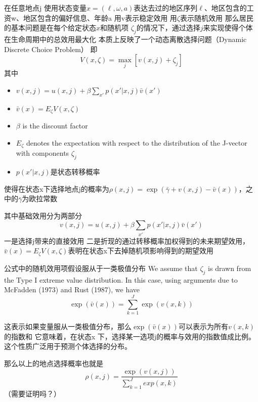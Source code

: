 \documentclass[10pt,a4paper]{article}
\begin{document}
在任意地点j
使用状态变量$x=(\ell,\omega,a)$表达去过的地区序列$\ell$、地区包含的工资w、地区包含的偏好信息、年龄a
用v表示稳定效用
用$\zeta$表示随机效用
那么居民的基本问题是在每个给定状态$x$和随机项 $\zeta_j$的情况下，通过选择$j$来实现使得个体在生命周期中的总效用最大化
本质上反映了一个动态离散选择问题（Dynamic Discrete Choice Problem）
即
\begin{equation}
V(x,\zeta)=\max\limits_{j}[v(x,j)+\zeta_{j}]
\end{equation}
其中
\begin{itemize}
\item $v(x, j) = u(x, j) + \beta \sum_{x'} p(x' | x, j) \bar{v}(x')$
\item $\bar{v}(x) = E_{\zeta} V(x, \zeta)$
\item $\beta$ is the discount factor
\item $E_{\zeta}$ denotes the expectation with respect to the distribution of the J-vector with components $\zeta_{j}$
\item $p(x'|x,j)$是状态转移概率
\end{itemize}

使得在状态x下选择地点j的概率为$\rho(x,j)=\exp(\bar \gamma+v(x,j)-\bar v(x))$，之中的$\bar \gamma$为欧拉常数

其中基础效用分为两部分
\begin{equation}
  v(x, j) = u(x, j) + \beta \sum_{x'} p(x' | x, j) \bar{v}(x')
\end{equation}
一是选择j带来的直接效用
二是折现的通过转移概率加权得到的未来期望效用，$\bar{v}(x) = E_{\zeta} V(x, \zeta)$表明在状态x下去掉随机项影响得到的期望效用

公式中的随机效用项假设服从于一类极值分布
We assume that $\zeta_j$ is drawn from the Type I extreme value distribution. In this case, using arguments due to McFadden (1973) and Rust (1987), we have
\begin{equation}
  \exp\left(\bar{v}(x)\right) = \sum_{k=1}^J \exp\left(v(x, k)\right)
\end{equation}

这表示如果变量服从一类极值分布，那么$\exp\left(\bar{v}(x)\right)$可以表示为所有$v(x, k)$的指数和
它意味着，在状态x 下，选择某一选项j的概率与效用的指数值成比例。
这个性质广泛用于预测个体选择的分布。

那么以上的地点选择概率也就是
\begin{equation}
  \rho(x,j)=\frac{\exp(v(x,j))}{\sum\limits_{k=1}^{J} exp(x,k)}
\end{equation}
（需要证明吗？）
\end{document}
